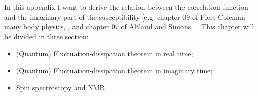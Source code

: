 
\textcolor{red!40!black}{
In this appendix I want to derive the relation between the correlation function and the imaginary part of the susceptibility [e.g. chapter 09 of Piers Coleman many body physics, \cite{coleman2015}, and chapter 07 of Altland and Simons, \cite{altland2010condensed}]. This chapter will be divided in three section:
\begin{itemize}
    \item (Quantum) Fluctuation-dissipation theorem in real time;
    \item (Quantum) Fluctuation-dissipation theorem in imaginary time;
    \item Spin spectroscopy and NMR .
\end{itemize}}



